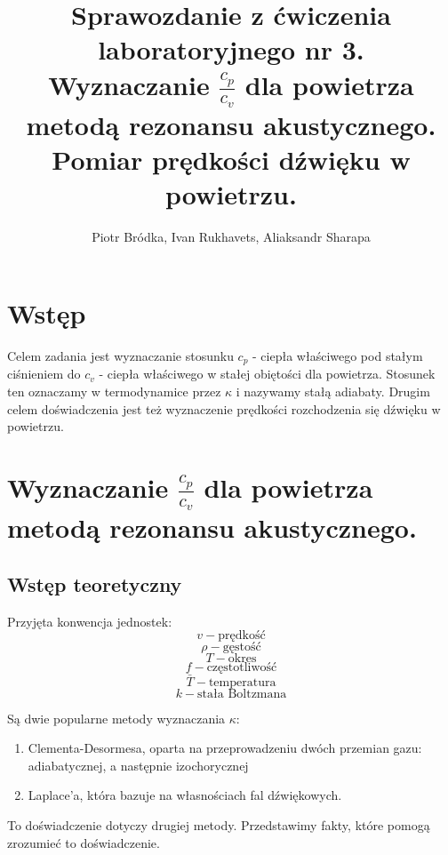 \documentclass[12pt,a4paper]{article}
\begin{document}
\begin{titlepage}


\title{%
Sprawozdanie z ćwiczenia laboratoryjnego nr 3.\\
\large  Wyznaczanie $\frac{c_p}{c_v}$ dla powietrza metodą rezonansu akustycznego. Pomiar prędkości dźwięku w powietrzu.}

\author{Piotr Bródka, Ivan Rukhavets, Aliaksandr Sharapa}


\maketitle
\end{titlepage}

\section{Wstęp}
Celem zadania jest wyznaczanie stosunku $c_p$ - ciepła właściwego pod stałym ciśnieniem do $c_v$ - ciepła właściwego w stałej obiętości dla powietrza. Stosunek ten oznaczamy w termodynamice przez $\kappa$ i nazywamy stałą adiabaty.
Drugim celem doświadczenia jest też wyznaczenie prędkości rozchodzenia się dźwięku w powietrzu.


\section{Wyznaczanie $\frac{c_p}{c_v}$ dla powietrza metodą rezonansu akustycznego.} 

\subsection{Wstęp teoretyczny}
Przyjęta konwencja jednostek:
$$
v - \text{prędkość}
$$
$$
\rho - \text{gęstość}
$$
$$
T - \text{okres}
$$
$$
f - \text{częstotliwość}
$$
$$
\bar{T} - \text{temperatura}
$$
$$
k - \text{stała Boltzmana}
$$



Są dwie popularne metody wyznaczania $\kappa$:
\begin{enumerate}
\item Clementa-Desormesa, oparta na przeprowadzeniu dwóch przemian gazu: adiabatycznej, a następnie izochorycznej \item Laplace'a, która bazuje na własnościach fal dźwiękowych. 
\end{enumerate} 

To doświadczenie dotyczy drugiej metody. Przedstawimy fakty, które pomogą zrozumieć to doświadczenie.
\end{document}

